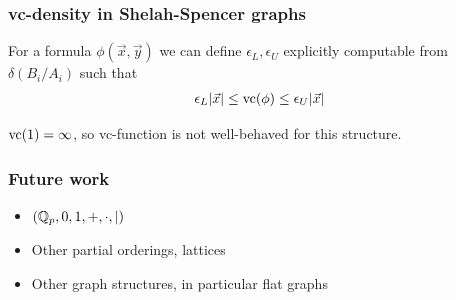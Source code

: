 \documentclass{beamer}
\begin{document}
\begin{frame}
	\frametitle{vc-density in Shelah-Spencer graphs}
	\begin{Theorem} [B., '15]
		For a formula $\phi(\vec x, \vec y)$ we can define $\epsilon_L, \epsilon_U$ explicitly computable from $\delta(B_i/A_i)$ such that
			\begin{align*}
				\epsilon_L |\vec x| \leq \operatorname{vc}(\phi) \leq \epsilon_U |\vec x|
			\end{align*}
	\end{Theorem}
	\begin{Corollary}
		$\operatorname{vc}(1) = \infty$, so vc-function is not well-behaved for this structure.
	\end{Corollary}
\end{frame}

\begin{frame}
	\frametitle{Future work}
	\begin{itemize}
		\item $(\mathbb{Q}_p, 0, 1, +, \cdot, \mid)$
		\item Other partial orderings, lattices
		\item Other graph structures, in particular flat graphs
	\end{itemize}
\end{frame}
\end{document}
